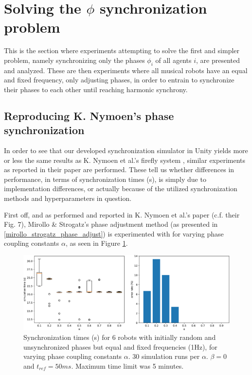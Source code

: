 \section{Solving the $\phi$ synchronization problem}
This is the section where experiments attempting to solve the first and simpler problem, namely synchronizing only the phases $\phi_i$ of all agents $i$, are presented and analyzed. These are then experiments where all musical robots have an equal and fixed frequency, only adjusting phases, in order to entrain to synchronize their phases to each other until reaching harmonic synchrony.
	
	\subsection{Reproducing K. Nymoen's phase synchronization}
	In order to see that our developed synchronization simulator in Unity yields more or less the same results as K. Nymoen et al.'s firefly system \cite{nymoen_synch}, similar experiments as reported in their paper are performed. These tell us whether differences in performance, in terms of synchronization times (s), is simply due to implementation differences, or actually because of the utilized synchronization methods and hyperparameters in question. 
	
	First off, and as performed and reported in K. Nymoen et al.'s paper \cite{nymoen_synch} (c.f. their Fig. 7), Mirollo \& Strogatz's phase adjustment method (as presented in \ref{mirollo_strogatz_phase_adjust}) is experimented with for varying phase coupling constants $\alpha$, as seen in Figure \ref{fig:exp1}.
	
	\begin{figure}[ht!]
		\centering
		\includegraphics[width=\linewidth]{Assets/DocSegments/Chapters/ExperimentsAndResults/Figures/PerfScores/experiment1_perfScores.pdf}
		\caption{Synchronization times (s) for 6 robots with initially random and unsynchronized phases but equal and fixed frequencies (1Hz), for varying phase coupling constants $\alpha$. 30 simulation runs per $\alpha$. $\beta=0$ and $t_{ref}=50ms$. Maximum time limit was 5 minutes.}
		\label{fig:exp1}
	\end{figure}
	
